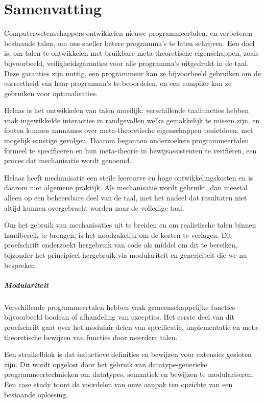 \chapter*{Samenvatting}

Computerwetenschappers ontwikkelen nieuwe programmeertalen, en verbeteren
bestaande talen, om ons sneller betere programma's te laten schrijven. Een doel
is, om talen te ontwikkelen met bruikbare meta-theoretische eigenschappen, zoals
bijvoorbeeld, veiligheidsgaranties voor alle programma's uitgedrukt in de taal.
Deze garanties zijn nuttig, een programmeur kan ze bijvoorbeeld gebruiken om de
correctheid van haar programma's te beoordelen, en een compiler kan ze gebruiken
voor optimalisaties.

Helaas is het ontwikkelen van talen moeilijk: verschillende taalfuncties hebben
vaak ingewikkelde interacties in randgevallen welke gemakkelijk te missen zijn,
en fouten kunnen aannames over meta-theoretische eigenschappen tenietdoen, met
mogelijk ernstige gevolgen. Daarom begonnen onderzoekers programmeertalen
formeel te specificeren en hun meta-theorie in bewijsassistenten te verifiëren,
een proces dat mechanisatie wordt genoemd.

Helaas heeft mechanisatie een steile leercurve en hoge ontwikkelingskosten
en is daarom niet algemene praktijk. %
Als mechanisatie wordt gebruikt, dan meestal alleen op een beheersbare deel van
de taal, met het nadeel dat resultaten niet altijd kunnen overgebracht worden
naar de volledige taal.

Om het gebruik van mechanisaties uit te breiden en om realistische talen binnen
handbereik te brengen, is het noodzakelijk om de kosten te verlagen. Dit
proefschrift onderzoekt hergebruik van code als middel om dit te bereiken,
bijzonder het principieel hergebruik via modulariteit en genericiteit die we nu
bespreken.


\paragraph{Modulariteit}
Verschillende programmeertalen hebben vaak gemeenschappelijke functies
bijvoorbeeld boolean of afhandeling van excepties. Het eerste deel van dit
proefschrift gaat over het modulair delen van specificatie, implementatie en
meta-theoretische bewijzen van functies door meerdere talen.

Een struikelblok is dat inductieve definities en bewijzen voor extensies
gesloten zijn. Dit wordt opgelost door het gebruik van datatype-generieke
programmeertechnieken om datatypes, semantiek en bewijzen te modulariseren. Een
case study toont de voordelen van onze aanpak ten opzichte van een bestaande
oplossing.

